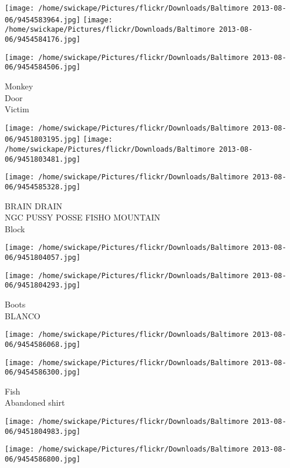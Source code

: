 \documentclass[10pt,letterpaper]{article}
\begin{document}
\texttt{[image: /home/swickape/Pictures/flickr/Downloads/Baltimore 2013-08-06/9454583964.jpg]}
\texttt{[image: /home/swickape/Pictures/flickr/Downloads/Baltimore 2013-08-06/9454584176.jpg]}

\vspace{0.25in}
\texttt{[image: /home/swickape/Pictures/flickr/Downloads/Baltimore 2013-08-06/9454584506.jpg]}

Monkey\\
Door\\
Victim
\pagebreak

\texttt{[image: /home/swickape/Pictures/flickr/Downloads/Baltimore 2013-08-06/9451803195.jpg]}
\texttt{[image: /home/swickape/Pictures/flickr/Downloads/Baltimore 2013-08-06/9451803481.jpg]}

\vspace{0.25in}
\texttt{[image: /home/swickape/Pictures/flickr/Downloads/Baltimore 2013-08-06/9454585328.jpg]}

BRAIN DRAIN\\
NGC PUSSY POSSE FISHO MOUNTAIN\\
Block
\pagebreak

\texttt{[image: /home/swickape/Pictures/flickr/Downloads/Baltimore 2013-08-06/9451804057.jpg]}

\vspace{0.25in}
\texttt{[image: /home/swickape/Pictures/flickr/Downloads/Baltimore 2013-08-06/9451804293.jpg]}

Boots\\
BLANCO
\pagebreak

\texttt{[image: /home/swickape/Pictures/flickr/Downloads/Baltimore 2013-08-06/9454586068.jpg]}

\vspace{0.25in}
\texttt{[image: /home/swickape/Pictures/flickr/Downloads/Baltimore 2013-08-06/9454586300.jpg]}

Fish\\
Abandoned shirt
\pagebreak

\texttt{[image: /home/swickape/Pictures/flickr/Downloads/Baltimore 2013-08-06/9451804983.jpg]}

\vspace{0.25in}
\texttt{[image: /home/swickape/Pictures/flickr/Downloads/Baltimore 2013-08-06/9454586800.jpg]}
\end{document}
